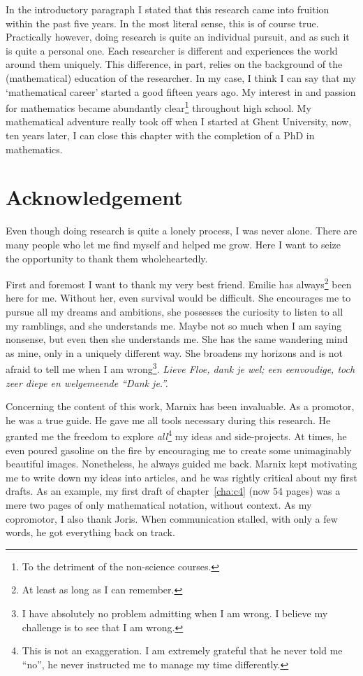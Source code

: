 In the introductory paragraph I stated that this research came into fruition within the past five years. In the most literal sense, this is of course true. Practically however, doing research is quite an individual pursuit, and as such it is quite a personal one. Each researcher is different and experiences the world around them uniquely. This difference, in part, relies on the background of the (mathematical) education of the researcher. In my case, I think I can say that my `mathematical career' started a good fifteen years ago. My interest in and passion for mathematics became abundantly clear\footnote{To the detriment of the non-science courses.} throughout high school. My mathematical adventure really took off when I started at Ghent University, now, ten years later, I can close this chapter with the completion of a PhD in mathematics.


\section*{Acknowledgement}

Even though doing research is quite a lonely process, I was never alone. There are many people who let me find myself and helped me grow. Here I want to seize the opportunity to thank them wholeheartedly.

First and foremost I want to thank my very best friend. Emilie has always\footnote{At least as long as I can remember.} been here for me. Without her, even survival would be difficult. She encourages me to pursue all my dreams and ambitions, she possesses the curiosity to listen to all my ramblings, and she understands me. Maybe not so much when I am saying nonsense, but even then she understands me. She has the same wandering mind as mine, only in a uniquely different way. She broadens my horizons and is not afraid to tell me when I am wrong\footnote{I have absolutely no problem admitting when I am wrong. I believe my challenge is to see that I am wrong.}. \emph{\foreignlanguage{dutch}{Lieve Floe, dank je wel; een eenvoudige, toch zeer diepe en welgemeende ``Dank je.''.}}

Concerning the content of this work, Marnix has been invaluable. As a promotor, he was a true guide. He gave me all tools necessary during this research. He granted me the freedom to explore \emph{all}\footnote{This is not an exaggeration. I am extremely grateful that he never told me ``no'', he never instructed me to manage my time differently.} my ideas and side-projects. At times, he even poured gasoline on the fire by encouraging me to create some unimaginably beautiful images. Nonetheless, he always guided me back. Marnix kept motivating me to write down my ideas into articles, and he was rightly critical about my first drafts. As an example, my first draft of chapter~\ref{cha:c4} (now 54 pages) was a mere two pages of only mathematical notation, without context. As my copromotor, I also thank Joris. When communication stalled, with only a few words, he got everything back on track.

